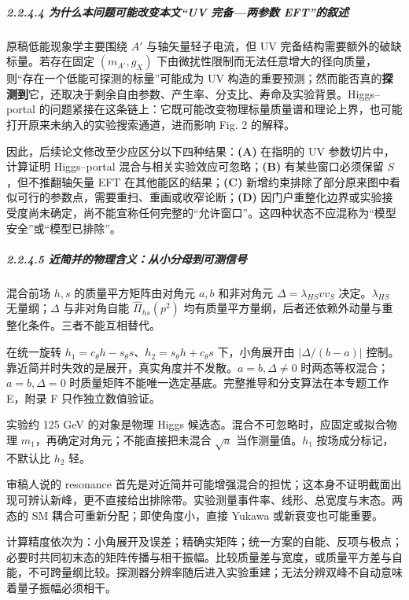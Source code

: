 \documentclass[
  chinese,
  UTF8]{ctexart}
\begin{document}
\subparagraph{2.2.4.4 为什么本问题可能改变本文``UV 完备---两参数
EFT''的叙述}\label{ux4e3aux4ec0ux4e48ux672cux95eeux9898ux53efux80fdux6539ux53d8ux672cux6587uv-ux5b8cux5907ux4e24ux53c2ux6570-eftux7684ux53d9ux8ff0}

原稿低能现象学主要围绕 \(A'\) 与轴矢量轻子电流，但 UV
完备结构需要额外的破缺标量。若存在固定 \((m_{A'},g_X)\)
下由微扰性限制而无法任意增大的径向质量，则``存在一个低能可探测的标量''可能成为
UV
构造的重要预测；然而能否真的\textbf{探测到}它，还取决于剩余自由参数、产生率、分支比、寿命及实验背景。Higgs--portal
的问题紧接在这条链上：它既可能改变物理标量质量谱和理论上界，也可能打开原来未纳入的实验搜索通道，进而影响
Fig. 2 的解释。

因此，后续论文修改至少应区分以下四种结果：\textbf{(A)} 在指明的 UV
参数切片中，计算证明 Higgs--portal
混合与相关实验效应可忽略；\textbf{(B)} 有某些窗口必须保留
\(S\)，但不推翻轴矢量 EFT 在其他能区的结果；\textbf{(C)}
新增约束排除了部分原来图中看似可行的参数点，需要重扫、重画或收窄论断；\textbf{(D)}
因门户重整化边界或实验接受度尚未确定，尚不能宣称任何完整的``允许窗口''。这四种状态不应混称为``模型安全''或``模型已排除''。

\subparagraph{2.2.4.5
近简并的物理含义：从小分母到可测信号}\label{ux8fd1ux7b80ux5e76ux7684ux7269ux7406ux542bux4e49ux4eceux5c0fux5206ux6bcdux5230ux53efux6d4bux4fe1ux53f7}

混合前场 \(h,s\) 的质量平方矩阵由对角元 \(a,b\) 和非对角元
\(\Delta=\lambda_{HS}vv_S\) 决定。\(\lambda_{HS}\) 无量纲；\(\Delta\)
与非对角自能 \(\widehat\Pi_{hs}(p^2)\)
均有质量平方量纲，后者还依赖外动量与重整化条件。三者不能互相替代。

在统一旋转 \(h_1=c_\theta h-s_\theta s\)、\(h_2=s_\theta h+c_\theta s\)
下，小角展开由 \(\lvert\Delta/(b-a)\rvert\)
控制。靠近简并时失效的是展开，真实角度并不发散。\(a=b,\Delta\ne0\)
时两态等权混合；\(a=b,\Delta=0\)
时质量矩阵不能唯一选定基底。完整推导和分支算法在本专题工作 E，附录 F
只作独立数值验证。

实验约 125 GeV 的对象是物理 Higgs
候选态。混合不可忽略时，应固定或拟合物理
\(m_1\)，再确定对角元；不能直接把未混合 \(\sqrt a\) 当作测量值。\(h_1\)
按场成分标记，不默认比 \(h_2\) 轻。

审稿人说的 resonance
首先是对近简并可能增强混合的担忧；这本身不证明截面出现可辨认新峰，更不直接给出排除带。实验测量事件率、线形、总宽度与末态。两态的
SM 耦合可重新分配；即使角度小，直接 Yukawa 或新衰变也可能重要。

计算精度依次为：小角展开及误差；精确实矩阵；统一方案的自能、反项与极点；必要时共同初末态的矩阵传播与相干振幅。比较质量差与宽度，或质量平方差与自能，不可跨量纲比较。探测器分辨率随后进入实验重建；无法分辨双峰不自动意味着量子振幅必须相干。
\end{document}
